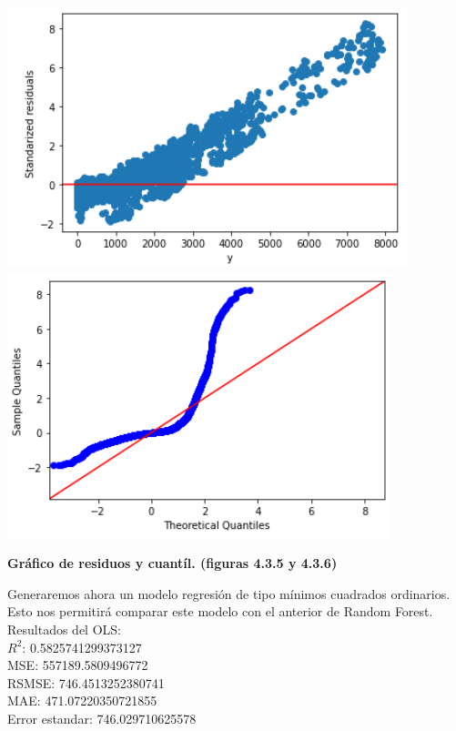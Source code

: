 \documentclass{article}
\begin{document}
            \includegraphics[scale=0.6]{images/residuos-discharge-SVR1.PNG} 
            \includegraphics[scale=0.6]{images/residuos-discharge-quantil3.PNG} \\
            \begin{center}
                \textbf{Gráfico de residuos y cuantíl. (figuras 4.3.5 y 4.3.6)}
            \end{center}        
    
    
        Generaremos ahora un modelo regresión de tipo mínimos cuadrados ordinarios. Esto nos permitirá comparar este modelo con el anterior de Random Forest.\\
        
        Resultados del OLS:\\
        $R^2$:  0.5825741299373127\\
        MSE:  557189.5809496772\\
        RSMSE:  746.4513252380741\\
        MAE:  471.07220350721855\\
        Error estandar:  746.029710625578\\
    
\end{document}
